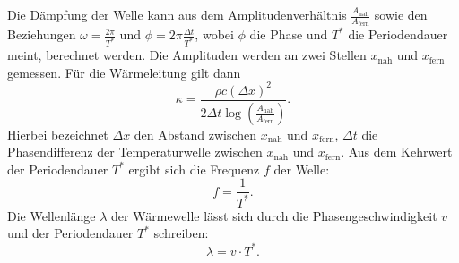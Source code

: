 Die Dämpfung der Welle kann aus dem Amplitudenverhältnis $\frac{A_{\text{nah}}}{A_{\text{fern}}}$
sowie den Beziehungen $\omega = \frac{2 \pi}{T^{*}}$ und $\phi = 2 \pi \frac{\Delta t}{ T^{*} }$, wobei
$\phi$ die Phase und $T^{*}$ die Periodendauer meint, berechnet werden. Die Amplituden
werden an zwei Stellen $x_{\text{nah}}$ und $x_{\text{fern}}$ gemessen. Für die Wärmeleitung
gilt dann
\begin{equation}
  \kappa = \frac{\rho c (\Delta x)^2}{2 \Delta t \log(\frac{A_{\text{nah}}}{A_{\text{fern}}})}.
  \label{eqn:wärmeleitfähigkeit}
\end{equation}
Hierbei bezeichnet $\Delta x$ den Abstand zwischen $x_{\text{nah}}$ und $x_{\text{fern}}$,
$\Delta t$ die Phasendifferenz der Temperaturwelle zwischen $x_{\text{nah}}$ und $x_{\text{fern}}$.
Aus dem Kehrwert der Periodendauer $T^{*}$ ergibt sich die Frequenz $f$ der Welle:
\begin{equation}
  f = \frac{1}{T^{*}}.
  \label{eqn:frequenz}
\end{equation}
Die Wellenlänge $\lambda$ der Wärmewelle lässt sich durch die Phasengeschwindigkeit $v$ und der
Periodendauer $T^{*}$ schreiben:
\begin{equation}
  \lambda = v \cdot T^{*}.
  \label{eqn:wellenlänge}
\end{equation}
